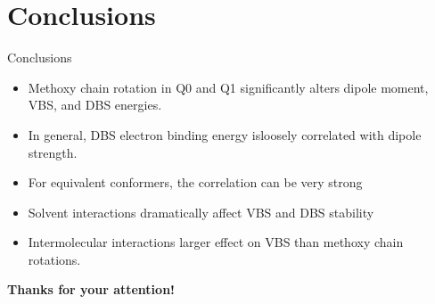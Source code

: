 \documentclass[9pt,t,xcolor=table]{beamer}
\begin{document}
\section{Conclusions}
\begin{frame}{\huge Conclusions}\large
	\begin{itemize}
		\item Methoxy chain rotation in Q0 and Q1 significantly alters dipole moment, VBS, and DBS energies.
		\item In general, DBS electron binding energy isloosely correlated with dipole strength.
		\item For equivalent conformers, the correlation can be very strong
		\item Solvent interactions dramatically affect VBS and DBS stability
		\item Intermolecular interactions larger effect on VBS than methoxy chain rotations.
	\end{itemize}	
	\centering
	\vspace{40pt}
	\Huge \textcolor{kul-blue}{\textbf{Thanks for your attention!}}
\end{frame}

\appendix
\end{document}
